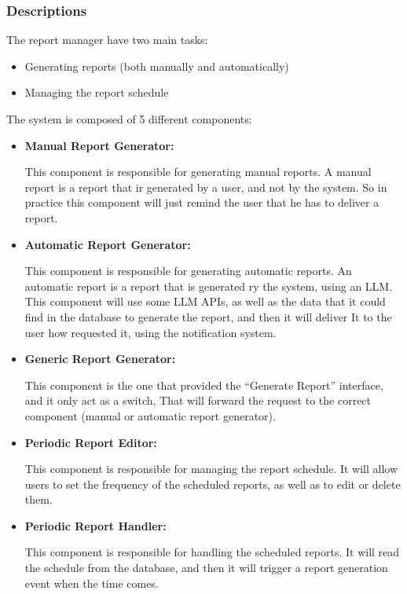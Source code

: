 \documentclass{article}
\begin{document}
\subsubsection{Descriptions}
The report manager have two main tasks:
\begin{itemize}
    \item Generating reports (both manually and automatically) 
    \item Managing the report schedule 
\end{itemize}

The system is composed of 5 different components:

\begin{itemize}
    \item \textbf{Manual Report Generator: }

    This component is responsible for generating manual reports. A manual report is a report that ir generated by a user, and not by the system.
    So in practice this component will just remind the user that he has to deliver a report.
    \item \textbf{Automatic Report Generator: }

    This component is responsible for generating automatic reports. An automatic report is a report that is generated ry the system,
    using an LLM. This component will use some LLM APIs, as well as the data that it could find in the database to generate the report, and then it will deliver It
    to the user how requested it, using the notification system.

    \item \textbf{Generic Report Generator: }
    
    This component is the one that provided the ``Generate Report'' interface, and it only act as a switch, That 
    will forward the request to the correct component (manual or automatic report generator).

    \item \textbf{Periodic Report Editor: }

    This component is responsible for managing the report schedule.
    It will allow users to set the frequency of the scheduled reports, as well as to edit or delete them.

    \item \textbf{Periodic Report Handler: }
    
    This component is responsible for handling the scheduled reports.
    It will read the schedule from the database, and then it will trigger a report generation event when the time comes.

\end{itemize}
\end{document}
